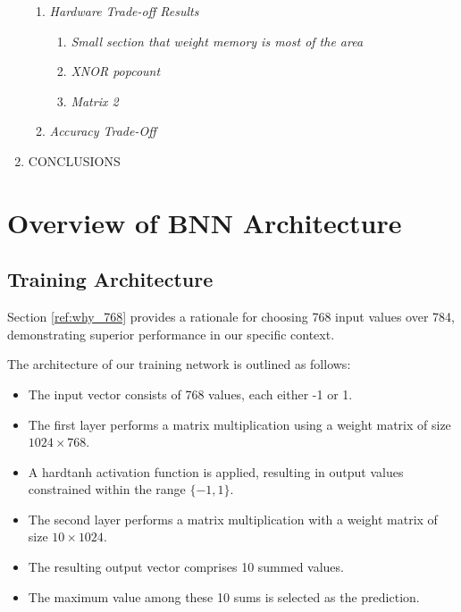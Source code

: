 \documentclass[conference]{IEEEtran}
\newcounter{todocount}
\newcommand{\todo}[1]{
  \stepcounter{todocount}
}
\begin{document}
\begin{enumerate}[label=\Roman*.]
\begin{enumerate}[label=\Alph*.]
            \item \textit{Hardware Trade-off Results}
            \begin{enumerate}[label=\arabic*.]
                \item \textit{Small section that weight memory is most of the area}
                \item \textit{XNOR popcount}
                \item \textit{Matrix 2}
            \end{enumerate}
            \item \textit{Accuracy Trade-Off}
        \end{enumerate}
    \item CONCLUSIONS
\end{enumerate}



\todo{written table of contents for coming sections -> DONE}

\section{Overview of BNN Architecture}

\subsection{Training Architecture}
Section \autoref{ref:why_768} provides a rationale for choosing 768 input values over 784, demonstrating superior performance in our specific context.

The architecture of our training network is outlined as follows:
\begin{itemize}
    \item The input vector consists of 768 values, each either -1 or 1.
    \item The first layer performs a matrix multiplication using a weight matrix of size \(1024 \times 768\).
    \item A hardtanh activation function is applied, resulting in output values constrained within the range \(\{-1, 1\}\).
    \item The second layer performs a matrix multiplication with a weight matrix of size \(10 \times 1024\).
    \item The resulting output vector comprises 10 summed values.
    \item The maximum value among these 10 sums is selected as the prediction.
\end{itemize}
\end{document}
